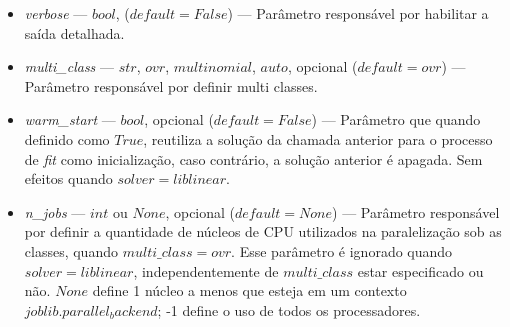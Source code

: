 \documentclass[
	12pt,				%
	oneside,			%
	a4paper,			%
	english,			%
	brazil				%
	]{abntex2ppgsi}
\begin{document}
{{\begin{apendicesenv}
\begin{itemize}
\item \textit{verbose} --- $bool$, ($default = False$) --- Parâmetro responsável por habilitar a saída detalhada.
\item \textit{multi\_class} --- $str$, $ovr$, $multinomial$, $auto$, opcional ($default=ovr$) --- Parâmetro responsável por definir multi classes.
\item \textit{warm\_start} --- $bool$, opcional ($default=False$) --- Parâmetro que quando definido como $True$, reutiliza a solução da chamada anterior para o processo de \textit{fit} como inicialização, caso contrário, a solução anterior é apagada. Sem efeitos quando $solver=liblinear$.
\item \textit{n\_jobs} --- $int$ ou $None$, opcional ($default=None$) --- Parâmetro responsável por definir a quantidade de núcleos de CPU utilizados na paralelização sob as classes, quando $multi\_class=ovr$. Esse parâmetro é ignorado quando $solver=liblinear$, independentemente de $multi\_class$ estar especificado ou não. $None$ define 1 núcleo a menos que esteja em um contexto $joblib.parallel_backend$; -1 define o uso de todos os processadores.
\end{itemize}


\end{apendicesenv}}}
\end{document}
